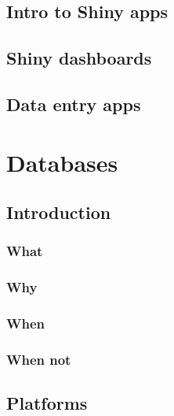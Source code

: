 \documentclass[
]{book}
\begin{document}
\hypertarget{intro-to-shiny-apps}{%
\chapter{Intro to Shiny apps}\label{intro-to-shiny-apps}}

\hypertarget{shiny-dashboards}{%
\chapter{Shiny dashboards}\label{shiny-dashboards}}

\hypertarget{data-entry-apps}{%
\chapter{Data entry apps}\label{data-entry-apps}}

\hypertarget{part-databases}{%
\part{Databases}\label{part-databases}}

\hypertarget{introduction-1}{%
\chapter{Introduction}\label{introduction-1}}

\hypertarget{what}{%
\section{What}\label{what}}

\hypertarget{why}{%
\section{Why}\label{why}}

\hypertarget{when}{%
\section{When}\label{when}}

\hypertarget{when-not}{%
\section{When not}\label{when-not}}

\hypertarget{platforms}{%
\chapter{Platforms}\label{platforms}}
\end{document}
